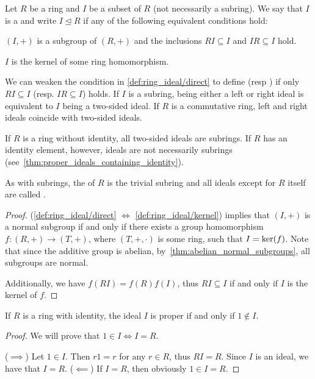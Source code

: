 \begin{definition}\label{def:ring_ideal}
  Let \( R \) be a ring and \( I \) be a subset of \( R \) (not necessarily a subring). We say that \( I \) is a  and write \( I \unlhd R \) if any of the following equivalent conditions hold:
  \begin{defenum}
    \item\label{def:ring_ideal/direct} \( (I, +) \) is a subgroup of \( (R, +) \) and the inclusions \( RI \subseteq I \) and \( IR \subseteq I \) hold.
    \item\label{def:ring_ideal/kernel} \( I \) is the kernel of some ring homomorphism.
  \end{defenum}

  We can weaken the condition in \ref{def:ring_ideal/direct} to define  (resp ) if only \( RI \subseteq I \) (resp. \( IR \subseteq I \)) holds. If \( I \) is a subring, being either a left or right ideal is equivalent to \( I \) being a two-sided ideal. If \( R \) is a commutative ring, left and right ideals coincide with two-sided ideals.

  If \( R \) is a ring without identity, all two-sided ideals are subrings. If \( R \) has an identity element, however, ideals are not necessarily subrings (see~\cref{thm:proper_ideals_containing_identity}).

  As with subrings, the  of \( R \) is the trivial subring and all ideals except for \( R \) itself are called .
\end{definition}
\begin{proof}
  (\ref{def:ring_ideal/direct} \( \iff \) \ref{def:ring_ideal/kernel})  implies that \( (I, +) \) is a normal subgroup if and only if there exists a group homomorphism \( f: (R, +) \to (T, +) \), where \( (T, +, \cdot) \) is some ring, such that \( I = \operatorname{ker}(f) \). Note that since the additive group is abelian, by~\cref{thm:abelian_normal_subgroups}, all subgroups are normal.

  Additionally, we have \( f(RI) = f(R)f(I) \), thus \( RI \subseteq I \) if and only if \( I \) is the kernel of \( f \).
\end{proof}

\begin{proposition}\label{thm:proper_ideals_containing_identity}
  If \( R \) is a ring with identity, the ideal \( I \) is proper if and only if \( 1 \not\in I \).
\end{proposition}
\begin{proof}
  We will prove that \( 1 \in I \iff I = R \).

  (\( \implies \)) Let \( 1 \in I \). Then \( r1 = r \) for any \( r \in R \), thus \( RI = R \). Since \( I \) is an ideal, we have that \( I = R \).
  (\( \impliedby \)) If \( I = R \), then obviously \( 1 \in I = R \).
\end{proof}

